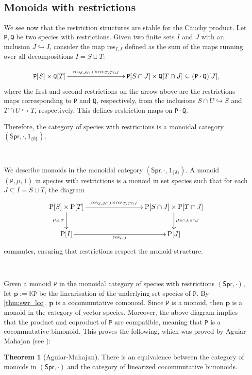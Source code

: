 \documentclass[12pt, reqno]{amsart}
\theoremstyle{definition}
\newtheorem{thm}{Theorem}[section]
\newcommand{\Spr}{\mathsf{Spr}} %
\newcommand{\rP}{\mathrm{P}}
\newcommand{\prP}{\mathtt{P}}
\newcommand{\prQ}{\mathtt{Q}}
\newcommand{\tp}{\mathbf{p}}
\begin{document}
\

\subsection{Monoids with restrictions}
We see now that the restriction structures are stable for the Cauchy product.
Let $\prP, \prQ$ be two species with restrictions.
Given two finite sets $I$ and $J$ with an inclusion $J \hookrightarrow I$, consider the map $\text{res}_{I,J}$ defined as the sum of the maps running over all decompositions $I=S\sqcup T$:

\[\xymatrix{
\prP[S]\times \prQ[T] \ar[rrr]^-{\text{res}_{S, S\cap J} \times \text{res}_{T, T\cap J}}&&& \prP[S\cap J]\times \prQ[T\cap J] \subseteq (\prP \cdot \prQ)[J],
}\]
where the first and second restrictions on the arrow above are the restrictions maps corresponding to $\prP$ and $\prQ$, respectively, from the inclusions $S \cap U \hookrightarrow S$ and $T \cap U \hookrightarrow T$, respectively. 
This defines restriction maps on $\prP \cdot \prQ$.
\

Therefore, the category of species with restrictions is a monoidal category $(\Spr, \cdot, \mathrm{1}_{\{\emptyset\}})$.

\

We describe monoids in the monoidal category $(\Spr, \cdot, \mathrm{1}_{\{\emptyset \} })$. 
A monoid $(\prP, \mu, 1)$ in species with restrictions is a monoid in set species such that for each $J \subseteq I=S\sqcup T$, the diagram
\[\xymatrix{
\rP[S]\times \rP[T]\ar[d]_-{\mu_{S,T}} \ar[rrr]^-{\text{res}_{S, S\cap J} \times \text{res}_{T, T\cap J}}&&&\rP[S \cap J]\times \rP[T\cap J]\ar[d]^-{\mu_{S \cap J, S\cap J}}\\
\rP[I]\ar[rrr]_-{\text{res}_{I,J}}&&& \rP[J]
}\]
commutes, ensuring that restrictions respect the monoid structure.

\

Given a monoid $\prP$ in the monoidal category of species with restrictions $(\Spr, \cdot)$, let $\tp:=\mathbb{K}\prP$ be the linearisation of the underlying set species of $\prP$. 
By \cref{thm:swr_lcc}, $\tp$ is a cocommutative comonoid. Since $\prP$ is a monoid, then $\tp$ is a monoid in the category of vector species. Moreover, the above diagram implies that the product and coproduct of $\prP$ are compatible, meaning that $\prP$ is a cocommutative bimonoid. 
This proves the following, which was proved by Aguiar-Mahajan (see \cite{AM2010}):

\begin{thm}[Aguiar-Mahajan]\label{MonRestr1}
There is an equivalence between the category of monoids in $(\Spr, \cdot)$ and the category of linearized cocommutative bimonoids.
\end{thm}
\end{document}

